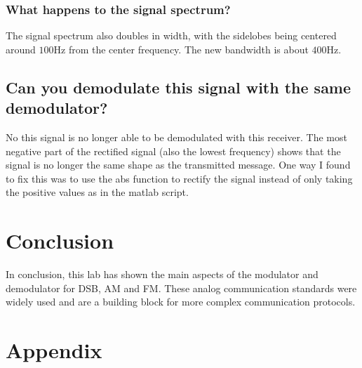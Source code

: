 \documentclass{article}
\begin{document}
    \subsubsection{What happens to the signal spectrum?}
    The signal spectrum also doubles in width, with the sidelobes being centered around $100$Hz from the
    center frequency. The new bandwidth is about $400$Hz.
    \subsection{Can you demodulate this signal with the same demodulator?}
    No this signal is no longer able to be demodulated with this receiver. The most negative part of the 
    rectified signal (also the lowest frequency) shows that the signal is no longer the same shape as the 
    transmitted message. One way I found to fix this was to use the abs function to rectify the signal instead
    of only taking the positive values as in the matlab script. 

    \section{Conclusion}
    In conclusion, this lab has shown the main aspects of the modulator and demodulator for DSB, AM and 
    FM. These analog communication standards were widely used and are a building block for more complex
    communication protocols. 

    \section{Appendix}
\end{document}
